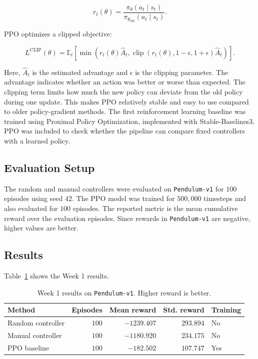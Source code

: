 \documentclass[11pt,a4paper]{article}
\begin{document}
\[
r_t(\theta) =
\frac{\pi_{\theta}(a_t \mid s_t)}
{\pi_{\theta_{\mathrm{old}}}(a_t \mid s_t)}.
\]

PPO optimizes a clipped objective:

\[
L^{\mathrm{CLIP}}(\theta)
=
\mathbb{E}_t
\left[
\min
\left(
r_t(\theta)\hat{A}_t,
\operatorname{clip}
\left(
r_t(\theta),
1-\epsilon,
1+\epsilon
\right)
\hat{A}_t
\right)
\right].
\]

Here, $\hat{A}_t$ is the estimated advantage and $\epsilon$ is the clipping parameter. The advantage indicates whether an action was better or worse than expected. The clipping term limits how much the new policy can deviate from the old policy during one update. This makes PPO relatively stable and easy to use compared to older policy-gradient methods.
The first reinforcement learning baseline was trained using Proximal Policy Optimization, implemented with Stable-Baselines3. PPO was included to check whether the pipeline can compare fixed controllers with a learned policy.

\subsection{Evaluation Setup}

The random and manual controllers were evaluated on \texttt{Pendulum-v1} for $100$ episodes using seed $42$. The PPO model was trained for $500{,}000$ timesteps and also evaluated for $100$ episodes.  The reported metric is the mean cumulative reward over the evaluation episodes. Since rewards in \texttt{Pendulum-v1} are negative, higher values are better.

\subsection{Results}

Table~\ref{tab:week1_results} shows the Week 1 results.

\begin{table}[h]
\centering
\caption{Week 1 results on \texttt{Pendulum-v1}. Higher reward is better.}
\label{tab:week1_results}
\begin{tabular}{|l|r|r|r|l|}
\hline
Method & Episodes & Mean reward & Std. reward & Training \\
\hline
Random controller & $100$ & $-1239.407$ & $293.894$ & No \\
Manual controller & $100$ & $-1180.920$ & $234.175$ & No \\
PPO baseline & $100$ & $-182.502$ & $107.747$ & Yes \\
\hline
\end{tabular}
\end{table}
\end{document}
